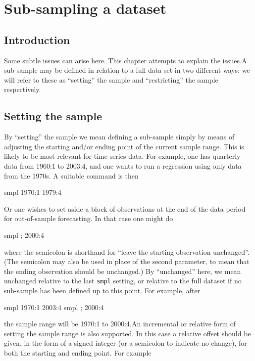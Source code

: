 \chapter{Sub-sampling a dataset}
\label{sampling}

\section{Introduction}
\label{sample-intro}

Some subtle issues can arise here.  This chapter attempts to explain
the issues.A sub-sample may be defined in relation to a full data set
in two different ways: we will refer to these as ``setting'' the
sample and ``restricting'' the sample respectively.

\section{Setting the sample}
\label{sample-set}

By ``setting'' the sample we mean defining a sub-sample simply by
means of adjusting the starting and/or ending point of the current
sample range.  This is likely to be most relevant for time-series
data.  For example, one has quarterly data from 1960:1 to 2003:4, and
one wants to run a regression using only data from the 1970s.  A
suitable command is then

      
\begin{code}
	smpl 1970:1 1979:4
\end{code}
Or one wishes to set aside a block of observations at the end of the
data period for out-of-sample forecasting.  In that case one might do

      
\begin{code}
	smpl ; 2000:4
\end{code}
where the semicolon is shorthand for ``leave the starting observation
unchanged''.  (The semicolon may also be used in place of the second
parameter, to mean that the ending observation should be unchanged.)
By ``unchanged'' here, we mean unchanged relative to the last
\verb+smpl+ setting, or relative to the full dataset if no sub-sample
has been defined up to this point. For example, after

      
\begin{code}
	smpl 1970:1 2003:4
	smpl ; 2000:4
\end{code}
the sample range will be 1970:1 to 2000:4.An incremental or relative
form of setting the sample range is also supported.  In this case a
relative offset should be given, in the form of a signed integer (or a
semicolon to indicate no change), for both the starting and ending
point. For example

